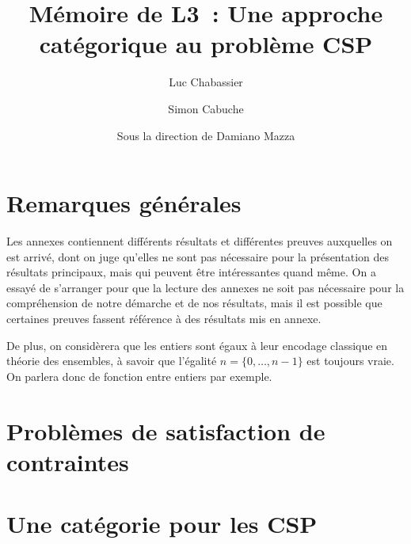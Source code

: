\documentclass[12pt]{article}
\title{Mémoire de L3~: Une approche catégorique au problème CSP}
\author{Luc Chabassier\and Simon Cabuche}
\date{\small Sous la direction de Damiano Mazza}
\begin{document}
\maketitle

\newpage
\tableofcontents
\newpage

\section*{Remarques générales}

Les annexes contiennent différents résultats et différentes preuves auxquelles
on est arrivé, dont on juge qu'elles ne sont pas nécessaire pour la
présentation des résultats principaux, mais qui peuvent être intéressantes
quand même. On a essayé de s'arranger pour que la lecture des annexes ne soit
pas nécessaire pour la compréhension de notre démarche et de nos résultats,
mais il est possible que certaines preuves fassent référence à des résultats
mis en annexe.

De plus, on considèrera que les entiers sont égaux à leur encodage classique en théorie
des ensembles, à savoir que l'égalité $n = \{0, \dots, n-1\}$ est toujours vraie. On
parlera donc de fonction entre entiers par exemple.


\section{Problèmes de satisfaction de contraintes}\label{secCSP}


\section{Une catégorie pour les CSP}\label{secCat}

\end{document}
